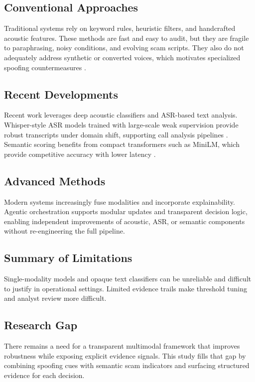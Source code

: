 \documentclass[11pt,a4paper]{article}
\begin{document}
\subsection{Conventional Approaches}
Traditional systems rely on keyword rules, heuristic filters, and handcrafted acoustic features. These methods are fast and easy to audit, but they are fragile to paraphrasing, noisy conditions, and evolving scam scripts. They also do not adequately address synthetic or converted voices, which motivates specialized spoofing countermeasures \cite{asvspoof2019}.

\subsection{Recent Developments}
Recent work leverages deep acoustic classifiers and ASR-based text analysis. Whisper-style ASR models trained with large-scale weak supervision provide robust transcripts under domain shift, supporting call analysis pipelines \cite{whisper2022}. Semantic scoring benefits from compact transformers such as MiniLM, which provide competitive accuracy with lower latency \cite{minilm2020}.

\subsection{Advanced Methods}
Modern systems increasingly fuse modalities and incorporate explainability. Agentic orchestration supports modular updates and transparent decision logic, enabling independent improvements of acoustic, ASR, or semantic components without re-engineering the full pipeline.

\subsection{Summary of Limitations}
Single-modality models and opaque text classifiers can be unreliable and difficult to justify in operational settings. Limited evidence trails make threshold tuning and analyst review more difficult.

\subsection{Research Gap}
There remains a need for a transparent multimodal framework that improves robustness while exposing explicit evidence signals. This study fills that gap by combining spoofing cues with semantic scam indicators and surfacing structured evidence for each decision.
\end{document}
